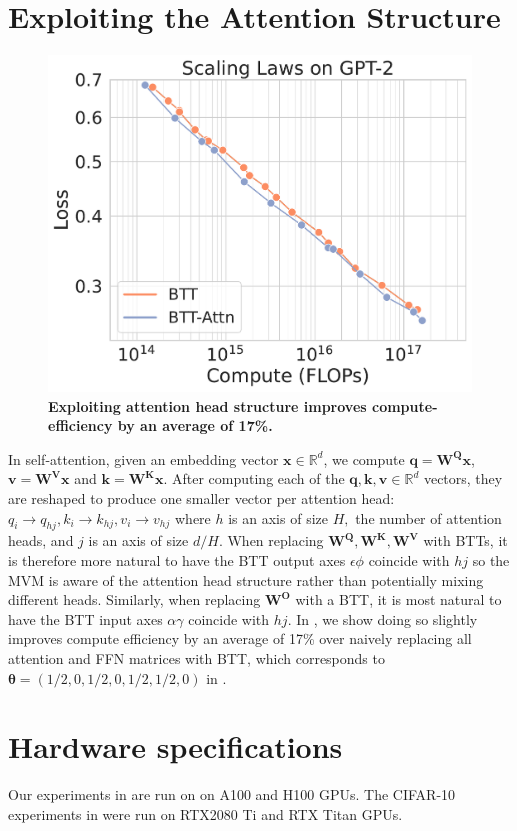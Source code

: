 \documentclass{article}
\newcommand{\mbf}[1]{{\boldsymbol{\mathbf{#1}}}}
\newcommand{\bm}{\mbf}
\begin{document}
\section{Exploiting the Attention Structure} \label{app:attn-struct}
\begin{figure}
    \vspace{-2mm}
  \includegraphics[width=\linewidth]{figs/head_scaling.pdf}
  \vspace{-5mm}
  \caption{\footnotesize \textbf{Exploiting attention head structure improves compute-efficiency by an average of 17\%.}}
  \label{fig:btt-attn}
  \vspace{-3mm}
\end{figure}
In self-attention, given an embedding vector $\bm{x} \in \mathbb{R}^{d}$, we compute $\bm{q} = \bm{W}^{\bm{Q}}\bm{x}$,
$\bm{v} = \bm{W}^{\bm{V}}\bm{x}$ and $\bm{k} = \bm{W}^{\bm{K}}\bm{x} $.
After computing each of the $\bm{q}, \bm{k}, \bm{v} \in \mathbb{R}^{d}$ vectors,
they are reshaped to produce one smaller vector per attention head: $q_{i} \to q_{hj}, k_{i} \to k_{hj}, v_{i} \to v_{hj}$ where $h$ is an axis of size $H,$ the number of attention heads, and $j$ is an axis of size $d/H.$  When replacing $\bm{W}^{\bm{Q}}, \bm{W}^{\bm{K}}, \bm{W}^{\bm{V}}$ with BTTs, it is therefore more natural to have the BTT output axes $\epsilon\phi$ coincide with $hj$ so the MVM is aware of the attention head structure rather than potentially mixing different heads. Similarly, when replacing $\bm{W}^{\bm{O}}$ with a BTT, it is most natural to have the BTT input axes $\alpha\gamma$ coincide with $hj.$ In , we show doing so slightly improves compute efficiency by an average of 17\% over naively replacing all attention and FFN matrices with BTT, which corresponds to $\bm{\theta}=(1/2,0,1/2,0,1/2,1/2,0)$ in .

\section{Hardware specifications} \label{app:hardware}
Our experiments in  are run on on A100 and H100 GPUs. The CIFAR-10 experiments in  were run on RTX2080 Ti and RTX Titan GPUs.
\end{document}
